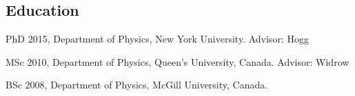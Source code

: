 \documentclass[11pt,letterpaper]{article}
\begin{document}
\subsection{Education}
\begin{list}{}{\cvlist}
  \item
        PhD 2015, Department of Physics, New York University. Advisor: Hogg
  \item
        MSc 2010, Department of Physics, Queen's University, Canada. Advisor: Widrow
  \item
        BSc 2008, Department of Physics, McGill University, Canada.
\end{list}
\end{document}
